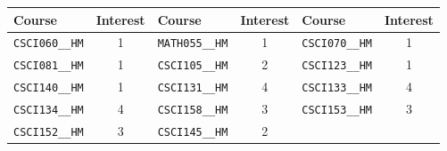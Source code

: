 \begin{tabular}{|p{}|c||p{}|c||p{}|c|}
    \hline
    Course & Interest & Course & Interest & Course & Interest\\\hline
    \verb|CSCI060__HM| & 1&
    \verb|MATH055__HM| & 1&
    \verb|CSCI070__HM| & 1\\
    \verb|CSCI081__HM| & 1&
    \verb|CSCI105__HM| & 2&
    \verb|CSCI123__HM| & 1\\
    \verb|CSCI140__HM| & 1&
    \verb|CSCI131__HM| & 4&
    \verb|CSCI133__HM| & 4\\
    \verb|CSCI134__HM| & 4&
    \verb|CSCI158__HM| & 3&
    \verb|CSCI153__HM| & 3\\
    \verb|CSCI152__HM| & 3&
    \verb|CSCI145__HM| & 2&&\\
    \hline
\end{tabular}